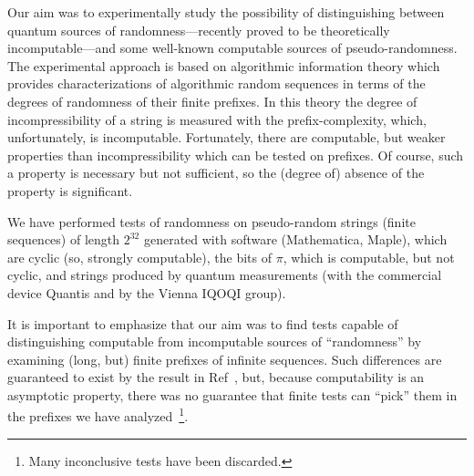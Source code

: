 \documentclass[10pt]{article}%
\begin{document}
\label{conclusion}

Our aim was to experimentally study the possibility of distinguishing between
quantum sources of randomness---recently proved to be theoretically incomputable---and  some well-known computable
sources of  pseudo-randomness. The experimental approach is based on algorithmic information theory
which provides characterizations of algorithmic random sequences in terms of the degrees of
randomness of their finite prefixes.
In this theory the degree of incompressibility of a string is measured with the prefix-complexity, which, unfortunately, is incomputable.
Fortunately, there are computable, but weaker properties than
incompressibility which can be tested on prefixes.
Of course, such a property is necessary but not sufficient, so the (degree of) absence of the property is significant.

We have performed
tests of randomness on pseudo-random strings (finite sequences) of length $2^{32}$ generated with software
(Mathematica, Maple), which are  cyclic (so, strongly computable), the bits of $\pi$, which is computable, but not cyclic, and strings produced by quantum measurements  (with the commercial device Quantis and  by the Vienna IQOQI group).

It is important to emphasize that our aim was to find tests capable of  distinguishing computable
from incomputable sources of ``randomness'' by examining (long, but) finite prefixes of infinite sequences.
Such differences are guaranteed to exist by the result in Ref~\cite{2008-cal-svo}, but,
because computability is an asymptotic property,
there was no guarantee that finite tests can ``pick'' them in the prefixes we have analyzed~\footnote{Many inconclusive tests have been discarded.}.
\end{document}
